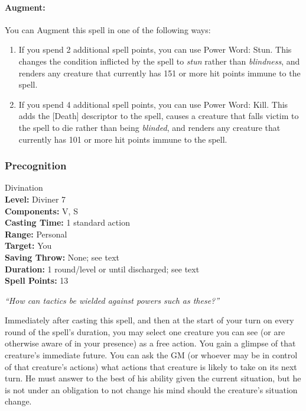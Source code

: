 \paragraph{Augment:} You can Augment this spell in one of the following ways:
\begin{enumerate}
\item If you spend 2 additional spell points, you can use Power Word: Stun. This changes the condition inflicted by the spell to \emph{stun} rather than \emph{blindness},
and renders any creature that currently has 151 or more hit points immune to the spell.
\item If you spend 4 additional spell points, you can use Power Word: Kill. 
This adds the [Death] descriptor to the spell, causes a creature that falls victim to the spell to die rather than being \emph{blinded}, 
and renders any creature that currently has 101 or more hit points immune to the spell.
\end{enumerate}

\subsubsection{Precognition}
\label{Spell:Precognition}
Divination
\\ \textbf{Level:} Diviner 7
\\ \textbf{Components:} V, S
\\ \textbf{Casting Time:} 1 standard action
\\ \textbf{Range:} Personal
\\ \textbf{Target:} You
\\ \textbf{Saving Throw:} None; see text
\\ \textbf{Duration:} 1 round/level or until discharged; see text
\\ \textbf{Spell Points:} 13

\emph{``How can tactics be wielded against powers such as these?''}

Immediately after casting this spell, 
and then at the start of your turn on every round of the spell's duration, 
you may select one creature you can see (or are otherwise aware of in your presence) as a free action.
You gain a glimpse of that creature's immediate future.
You can ask the GM (or whoever may be in control of that creature's actions) what actions that creature is likely to take on its next turn.
He must answer to the best of his ability given the current situation, but he is not under an obligation to not change his mind should the creature's situation change.

